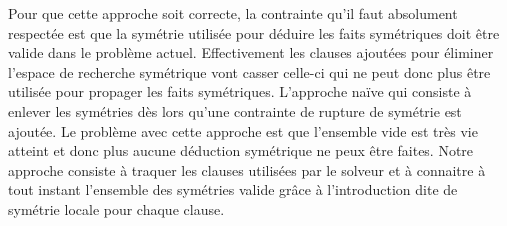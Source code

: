Pour que cette approche soit correcte, la contrainte qu'il faut absolument respectée est que la symétrie utilisée pour déduire les
faits symétriques doit être valide dans le problème actuel. Effectivement les clauses ajoutées pour éliminer l'espace de recherche
symétrique vont casser celle-ci qui ne peut donc plus être utilisée pour propager les faits symétriques.
L'approche naïve qui consiste à enlever les symétries dès lors qu'une contrainte de rupture de symétrie est ajoutée. Le problème avec cette approche est que l'ensemble vide est très vie atteint et donc plus aucune déduction symétrique ne peux être faites. Notre approche consiste à traquer les clauses utilisées par le solveur et à connaitre à tout instant l'ensemble des symétries valide grâce à l'introduction dite de symétrie locale pour chaque clause.

\begin{table}[!htbp]\footnotesize
	\centering
	\caption{Comparaison des approches sur les instances SAT.}
	\label{tab:satfr}
\end{table}%


